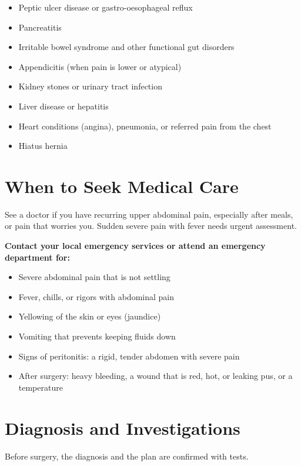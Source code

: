 \begin{itemize}
    \item Peptic ulcer disease or gastro-oesophageal reflux
    \item Pancreatitis
    \item Irritable bowel syndrome and other functional gut disorders
    \item Appendicitis (when pain is lower or atypical)
    \item Kidney stones or urinary tract infection
    \item Liver disease or hepatitis
    \item Heart conditions (angina), pneumonia, or referred pain from the chest
    \item Hiatus hernia
\end{itemize}

\section*{When to Seek Medical Care}
See a doctor if you have recurring upper abdominal pain, especially after meals, or pain that worries you. Sudden severe pain with fever needs urgent assessment.

\textbf{Contact your local emergency services or attend an emergency department for:}
\begin{itemize}
    \item Severe abdominal pain that is not settling
    \item Fever, chills, or rigors with abdominal pain
    \item Yellowing of the skin or eyes (jaundice)
    \item Vomiting that prevents keeping fluids down
    \item Signs of peritonitis: a rigid, tender abdomen with severe pain
    \item After surgery: heavy bleeding, a wound that is red, hot, or leaking pus, or a temperature
\end{itemize}

\section*{Diagnosis and Investigations}
Before surgery, the diagnosis and the plan are confirmed with tests.

